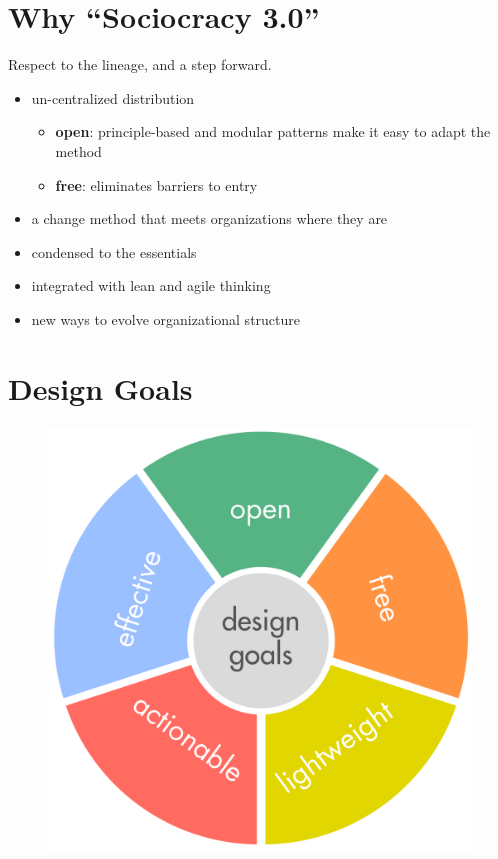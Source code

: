 \chapter{Why ``Sociocracy 3.0''}
\label{whysociocracy3.0}

Respect to the lineage, and a step forward.

\begin{itemize}
\item un-centralized distribution

\begin{itemize}
\item \textbf{open}: principle-based and modular patterns make it easy to adapt the method

\item \textbf{free}: eliminates barriers to entry

\end{itemize}

\item a change method that meets organizations where they are

\item condensed to the essentials

\item integrated with lean and agile thinking

\item new ways to evolve organizational structure

\end{itemize}

\chapter{Design Goals}
\label{designgoals}

\begin{figure}[htbp]
\centering
\includegraphics[keepaspectratio,width=\textwidth,height=0.75\textheight]{img/general/design-goals.png}
\end{figure}

